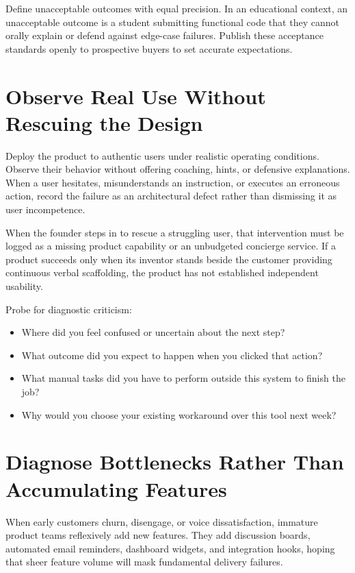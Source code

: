 Define unacceptable outcomes with equal precision. In an educational context, an unacceptable outcome is a student submitting functional code that they cannot orally explain or defend against edge-case failures. Publish these acceptance standards openly to prospective buyers to set accurate expectations.

\section{Observe Real Use Without Rescuing the Design}

Deploy the product to authentic users under realistic operating conditions. Observe their behavior without offering coaching, hints, or defensive explanations. When a user hesitates, misunderstands an instruction, or executes an erroneous action, record the failure as an architectural defect rather than dismissing it as user incompetence.

When the founder steps in to rescue a struggling user, that intervention must be logged as a missing product capability or an unbudgeted concierge service. If a product succeeds only when its inventor stands beside the customer providing continuous verbal scaffolding, the product has not established independent usability.

Probe for diagnostic criticism:
\begin{itemize}[leftmargin=*]
\item Where did you feel confused or uncertain about the next step?
\item What outcome did you expect to happen when you clicked that action?
\item What manual tasks did you have to perform outside this system to finish the job?
\item Why would you choose your existing workaround over this tool next week?
\end{itemize}

\section{Diagnose Bottlenecks Rather Than Accumulating Features}

When early customers churn, disengage, or voice dissatisfaction, immature product teams reflexively add new features. They add discussion boards, automated email reminders, dashboard widgets, and integration hooks, hoping that sheer feature volume will mask fundamental delivery failures.

